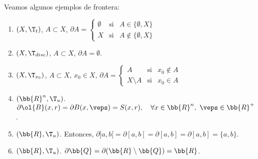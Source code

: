 \begin{ejemplo}
    Veamos algunos ejemplos de frontera:
    \begin{enumerate}
        \item $(X,\T_t)$, $A\subset X$, $\partial A = \left\{\begin{array}{ccc}
            \emptyset & \text{si} & A\in \{\emptyset, X\} \\
            X & \text{si} & A\notin \{\emptyset, X\}
        \end{array}\right.$

        \item $(X,\T_{disc})$, $A\subset X$, $\partial A = \emptyset$.

        \item $(X,\T_{x_0})$, $A\subset X$, $x_0\in X$, $\partial A = \left\{\begin{array}{ccc}
            A & \text{si} & x_0\notin A \\
            X\setminus A & \text{si} & x_0\in A
        \end{array}\right.$

        \item $(\bb{R}^n, \T_u)$. $\partial \ol{B}(x,r) = \partial B(x,\veps) = S(x,r),\quad \forall x\in \bb{R}^n,~\veps\in \bb{R}^+$.

        \item $(\bb{R}, \T_u)$. Entonces, $\partial ]a,b[ = \partial [a,b[ = \partial [a,b]=\partial ]a,b] = \{a,b\}$.
        \item $(\bb{R}, \T_u)$. $\partial \bb{Q}= \partial (\bb{R}\setminus \bb{Q})=\bb{R}$.
    \end{enumerate}
\end{ejemplo}

